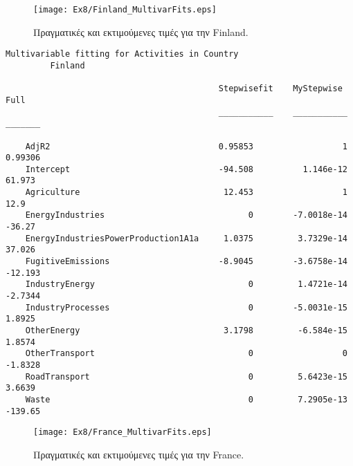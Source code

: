 \documentclass[11pt]{scrartcl} %
\begin{document}
\begin{figure}[H]

	\centering
	\texttt{[image: Ex8/Finland\_MultivarFits.eps]}	
\caption{Πραγματικές και εκτιμούμενες τιμές για την Finland.}
\label{fig:z84} 
\end{figure}



\begin{Verbatim}[fontsize=\small]
Multivariable fitting for Activities in Country
 	 	 Finland

                                           Stepwisefit    MyStepwise      Full  
                                           ___________    ___________    _______

    AdjR2                                  0.95853                  1    0.99306
    Intercept                              -94.508          1.146e-12     61.973
    Agriculture                             12.453                  1       12.9
    EnergyIndustries                             0        -7.0018e-14     -36.27
    EnergyIndustriesPowerProduction1A1a     1.0375         3.7329e-14     37.026
    FugitiveEmissions                      -8.9045        -3.6758e-14    -12.193
    IndustryEnergy                               0         1.4721e-14    -2.7344
    IndustryProcesses                            0        -5.0031e-15     1.8925
    OtherEnergy                             3.1798         -6.584e-15     1.8574
    OtherTransport                               0                  0    -1.8328
    RoadTransport                                0         5.6423e-15     3.6639
    Waste                                        0         7.2905e-13    -139.65
\end{Verbatim}


\begin{figure}[H]
 
	\centering
	\texttt{[image: Ex8/France\_MultivarFits.eps]}	
\caption{Πραγματικές και εκτιμούμενες τιμές για την France.}
\label{fig:z85}
\end{figure}
\end{document}
